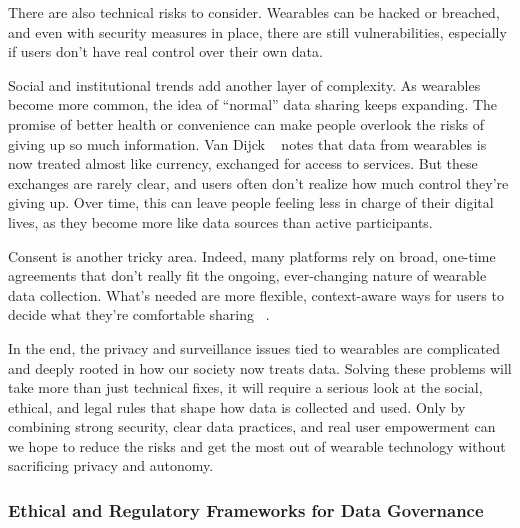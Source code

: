 	There are also technical risks to consider. Wearables can be hacked or breached, and even with security measures in place, there are still vulnerabilities, especially if users don’t have real control over their own data.

	Social and institutional trends add another layer of complexity. As wearables become more common, the idea of “normal” data sharing keeps expanding. The promise of better health or convenience can make people overlook the risks of giving up so much information. Van Dijck ~\cite{VanDijck2014} notes that data from wearables is now treated almost like currency, exchanged for access to services. But these exchanges are rarely clear, and users often don’t realize how much control they’re giving up. Over time, this can leave people feeling less in charge of their digital lives, as they become more like data sources than active participants.

	Consent is another tricky area. Indeed, many platforms rely on broad, one-time agreements that don’t really fit the ongoing, ever-changing nature of wearable data collection. What’s needed are more flexible, context-aware ways for users to decide what they’re comfortable sharing ~\cite{Riso2017}.

	In the end, the privacy and surveillance issues tied to wearables are complicated and deeply rooted in how our society now treats data. Solving these problems will take more than just technical fixes, it will require a serious look at the social, ethical, and legal rules that shape how data is collected and used. Only by combining strong security, clear data practices, and real user empowerment can we hope to reduce the risks and get the most out of wearable technology without sacrificing privacy and autonomy.
	\subsubsection{Ethical and Regulatory Frameworks for Data Governance}

